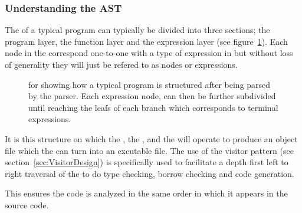\subsubsection{Understanding the AST}
\label{sec:AST}

The \ast{} of a typical \lang{} program can typically be divided into three
sections; the program layer, the function layer and the expression layer (see
figure~\ref{fig:astStruct}). Each node in the \ast{} correspond one-to-one with a
type of expression in \lang{} but without loss of generality they will just be
refered to as nodes or expressions.

\begin{figure}[ht]
  \centering
  \caption{\ast{} for \lang{} showing how a typical program is structured after
  being parsed by the \lang{} parser. Each expression node, can then be further
subdivided until reaching the leafs of each branch which corresponds to terminal
expressions.}
  \label{fig:astStruct}
\end{figure}

It is this structure on which the \typeChecker, the \borrowChecker, and the
\codeGen{} will operate to produce an object file which the \gcc{} can turn into an
excutable file. The use of the visitor pattern (see section~\ref{sec:VisitorDesign}) is
specifically used to facilitate a depth first left to right traversal of the \ast{} to do
type checking, borrow checking and code generation.

This ensures the code is analyzed in the same order in which it appears in the
source code.
